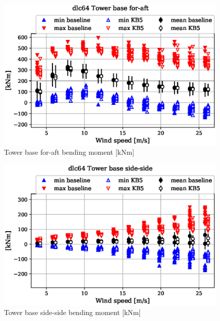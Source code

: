 \begin{figure}[!ht]
\begin{center}
	\includegraphics[width=.85\linewidth]{figures/baseline-vs-KB6/dlc64/tower-tower-node-001-momentvec-x_AA0008_AA0008.eps}
\end{center}
\caption{Tower base for-aft bending moment [kNm]}
\label{fig:baseline-vs-KB6:dlc64:tower-base-fa}
\end{figure}

\begin{figure}[!ht]
\begin{center}
	\includegraphics[width=.85\linewidth]{figures/baseline-vs-KB6/dlc64/tower-tower-node-001-momentvec-y_AA0008_AA0008.eps}
\end{center}
\caption{Tower base side-side bending moment [kNm]}
\label{fig:baseline-vs-KB6:dlc64:tower-base-ss}
\end{figure}

